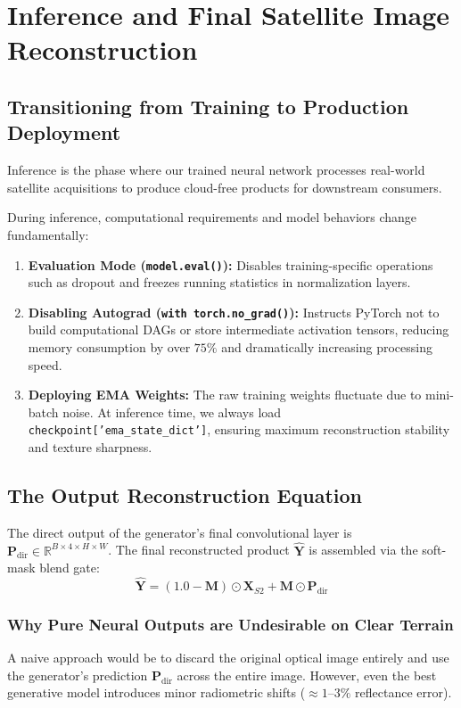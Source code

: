 \chapter{Inference and Final Satellite Image Reconstruction}
\label{chap:ch17}

\section{Transitioning from Training to Production Deployment}
Inference is the phase where our trained neural network processes real-world satellite acquisitions to produce cloud-free products for downstream consumers.

During inference, computational requirements and model behaviors change fundamentally:
\begin{enumerate}
    \item \textbf{Evaluation Mode (\texttt{model.eval()}):} Disables training-specific operations such as dropout and freezes running statistics in normalization layers.
    \item \textbf{Disabling Autograd (\texttt{with torch.no\_grad()}):} Instructs PyTorch not to build computational DAGs or store intermediate activation tensors, reducing memory consumption by over $75\%$ and dramatically increasing processing speed.
    \item \textbf{Deploying EMA Weights:} The raw training weights fluctuate due to mini-batch noise. At inference time, we always load \texttt{checkpoint['ema\_state\_dict']}, ensuring maximum reconstruction stability and texture sharpness.
\end{enumerate}

\section{The Output Reconstruction Equation}
The direct output of the generator's final convolutional layer is $\mathbf{P}_{\text{dir}} \in \mathbb{R}^{B \times 4 \times H \times W}$. The final reconstructed product $\hat{\mathbf{Y}}$ is assembled via the soft-mask blend gate:
\begin{equation}
\hat{\mathbf{Y}} = (1.0 - \mathbf{M}) \odot \mathbf{X}_{S2} + \mathbf{M} \odot \mathbf{P}_{\text{dir}}
\end{equation}

\subsection{Why Pure Neural Outputs are Undesirable on Clear Terrain}
A naive approach would be to discard the original optical image entirely and use the generator's prediction $\mathbf{P}_{\text{dir}}$ across the entire image. However, even the best generative model introduces minor radiometric shifts ($\approx 1\text{--}3\%$ reflectance error). 


